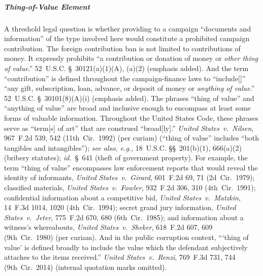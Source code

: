 \subparagraph{Thing-of-Value Element}
A threshold legal question is whether providing to a campaign ``documents and information'' of the type involved here would constitute a prohibited campaign contribution.
The foreign contribution ban is not limited to contributions of money.
It expressly prohibits ``a contribution or donation of money or \textit{other thing of value}.''
52~U.S.C. \S~30121(a)(1)(A), (a)(2) (emphasis added).
And the term ``contribution'' is defined throughout the campaign-finance laws to ``include[]'' ``any gift, subscription, loan, advance, or deposit of money or \textit{anything of value}.''
52~U.S.C. \S~30101(8)(A)(i) (emphasis added).
The phrases ``thing of value'' and ``anything of value'' are broad and inclusive enough to encompass at least some forms of valuable information.
Throughout the United States Code, these phrases serve as ``term[s] of art'' that are construed ``broad[ly].''
\textit{United States~v.\ Nilsen}, 967~F.2d 539, 542 (11th~Cir.~1992) (per curiam) (``thing of value'' includes ``both tangibles and intangibles''); \textit{see also, e.g.}, 18~U.S.C. \S\S~201(b)(1), 666(a)(2) (bribery statutes); \textit{id.}~\S~641 (theft of government property).
For example, the term ``thing of value'' encompasses law enforcement reports that would reveal the identity of informants, \textit{United States~v.\ Girard}, 601~F.2d 69, 71 (2d~Cir.~1979); classified materials, \textit{United States~v.\ Fowler}, 932~F.2d 306, 310 (4th~Cir.~1991); confidential information about a competitive bid, \textit{United States~v.\ Matzkin}, 14~F.3d 1014, 1020 (4th~Cir.~1994); secret grand jury information, \textit{United States~v.\ Jeter}, 775~F.2d 670, 680 (6th~Cir.~1985); and information about a witness's whereabouts, \textit{United States~v.\ Sheker}, 618~F.2d 607, 609 (9th~Cir.~1980) (per curiam).
And in the public corruption context, ``\thinspace`thing of value' is defined broadly to include the value which the defendant subjectively attaches to the items received.''
\textit{United States~v.\ Renzi}, 769~F.3d 731, 744 (9th~Cir.~2014) (internal quotation marks omitted).

